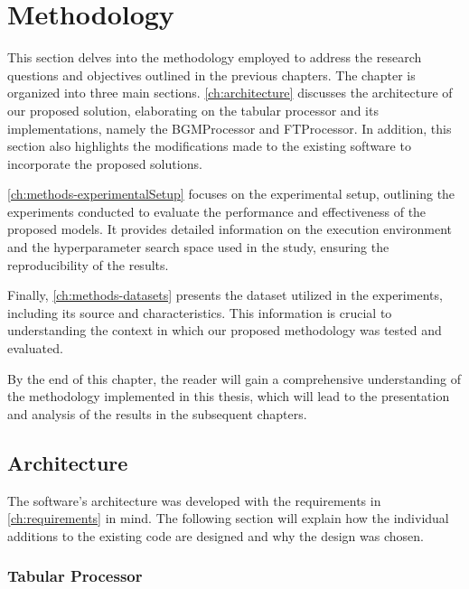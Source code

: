 \chapter{Methodology}
\label{ch:methodology}

This section delves into the methodology employed to address the research questions and objectives outlined in the previous chapters.
The chapter is organized into three main sections.
\autoref{ch:architecture} discusses the architecture of our proposed solution, elaborating on the tabular processor and its implementations, namely the BGMProcessor and FTProcessor.
In addition, this section also highlights the modifications made to the existing software to incorporate the proposed solutions.

\autoref{ch:methods-experimentalSetup} focuses on the experimental setup, outlining the experiments conducted to evaluate the performance and effectiveness of the proposed models.
It provides detailed information on the execution environment and the hyperparameter search space used in the study, ensuring the reproducibility of the results.

Finally, \autoref{ch:methods-datasets} presents the dataset utilized in the experiments, including its source and characteristics.
This information is crucial to understanding the context in which our proposed methodology was tested and evaluated.

By the end of this chapter, the reader will gain a comprehensive understanding of the methodology implemented in this thesis, which will lead to the presentation and analysis of the results in the subsequent chapters.

\section{Architecture}
\label{ch:architecture}

The software's architecture was developed with the requirements in \autoref{ch:requirements} in mind.
The following section will explain how the individual additions to the existing code are designed and why the design was chosen.


\subsection{Tabular Processor}
\label{ch:architecture-tabularProcessor}

